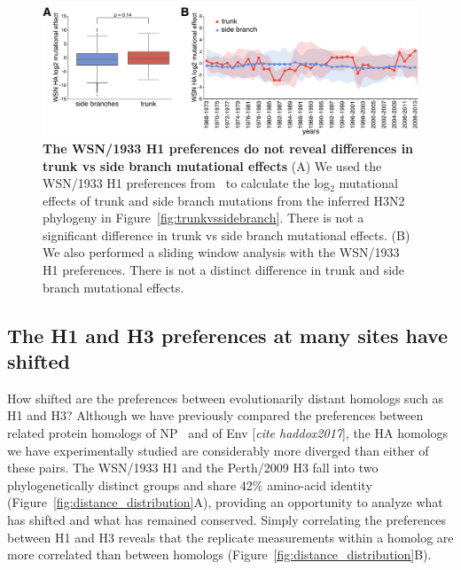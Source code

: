 \documentclass[11pt]{article}
\newcommand{\comment}[1]{{\color{red}[\textsl{#1}]}}
\begin{document}
\begin{figure}
\centerline{\includegraphics[width=\textwidth]{figs/WSN_trunkvssidebranch/WSN_trunkvssidebranch.pdf}}
\caption{\label{fig:WSN_trunkvssidebranch}
{\bf The WSN/1933 H1 preferences do not reveal differences in trunk vs side branch mutational effects}
(A) We used the WSN/1933 H1 preferences from~\cite{doud2016accurate} to calculate the log$_{2}$ mutational effects of trunk and side branch mutations from the inferred H3N2 phylogeny in Figure~\ref{fig:trunkvssidebranch}.
There is not a significant difference in trunk vs side branch mutational effects.
(B) We also performed a sliding window analysis with the WSN/1933 H1 preferences.
There is not a distinct difference in trunk and side branch mutational effects.
}
\end{figure}

\subsection*{The H1 and H3 preferences at many sites have shifted}
How shifted are the preferences between evolutionarily distant homologs such as H1 and H3?
Although we have previously compared the preferences between related protein homologs of NP~\citep{doud2015site} and of Env \comment{cite haddox2017}, the HA homologs we have experimentally studied are considerably more diverged than either of these pairs.
The WSN/1933 H1 and the Perth/2009 H3 fall into two phylogenetically distinct groups and share 42\% amino-acid identity (Figure~\ref{fig:distance_distribution}A), providing an opportunity to analyze what has shifted and what has remained conserved.
Simply correlating the preferences between H1 and H3 reveals that the replicate measurements within a homolog are more correlated than between homologs (Figure~\ref{fig:distance_distribution}B).
\end{document}
